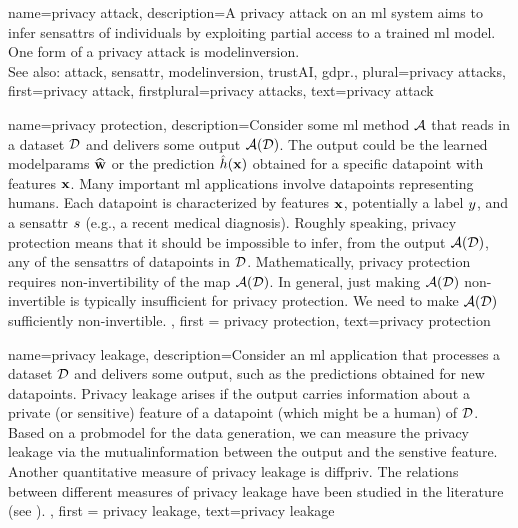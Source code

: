 {name={privacy attack},
	description={A privacy \gls{attack} on an \gls{ml} system aims to infer 
		\glspl{sensattr} of individuals by exploiting partial access to a trained \gls{ml} \gls{model}. 
		One form of a privacy \gls{attack} is \gls{modelinversion}.\\
		See also: \gls{attack}, \gls{sensattr}, \gls{modelinversion}, \gls{trustAI}, \gls{gdpr}.},
	plural={privacy attacks}, 
	first={privacy attack},
	firstplural={privacy attacks}, 
	text={privacy attack}
}

{name={privacy protection},
     description={Consider some \gls{ml} method $\mathcal{A}$ that reads 
	 in a \gls{dataset} $\mathcal{D}$ and delivers some output $\mathcal{A}(\mathcal{D})$. The output 
	 could be the learned \gls{modelparams} $\widehat{{\bf w}}$ or the \gls{prediction} 
	 $\hat{h}({\bf x})$ obtained for a specific \gls{datapoint} with \gls{feature}s 
	 ${\bf x}$. Many important \gls{ml} applications involve \gls{datapoint}s 
		representing humans. Each \gls{datapoint} is characterized by \gls{feature}s ${\bf x}$, 
		potentially a \gls{label} $y$, and a \gls{sensattr} $s$ (e.g., a recent medical diagnosis). 
		Roughly speaking, privacy protection means that it should be impossible to infer, from the output $\mathcal{A}(\mathcal{D})$, 
		any of the \gls{sensattr}s of \gls{datapoint}s in $\mathcal{D}$. Mathematically, privacy protection requires non-invertibility 
		of the map $\mathcal{A}(\mathcal{D})$. In general, just making $\mathcal{A}(\mathcal{D})$ non-invertible 
		is typically insufficient for privacy protection. We need to make $\mathcal{A}(\mathcal{D})$ sufficiently non-invertible. 
	}, 
	first = {privacy protection}, text={privacy protection} 
}

{
	name=privacy leakage,
	description={Consider an \gls{ml} application that processes a 
	\gls{dataset} $\mathcal{D}$ and delivers some output, such as the \gls{prediction}s 
	obtained for new \gls{datapoint}s. Privacy leakage arises 
	if the output carries information about a private (or sensitive) \gls{feature} of 
	a \gls{datapoint} (which might be a human) of $\mathcal{D}$. Based on a \gls{probmodel} 
	for the \gls{data} generation, we can measure the privacy leakage via the \gls{mutualinformation} 
	between the output and the senstive \gls{feature}. Another quantitative measure of privacy leakage 
	is \gls{diffpriv}. The relations between different measures of privacy leakage have been 
	studied in the literature (see \cite{InfThDiffPriv}). 
	}, 
	first = {privacy leakage}, text={privacy leakage} 
}




